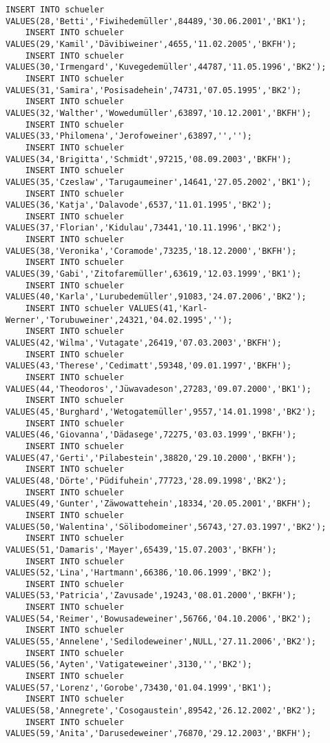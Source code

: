 \begin{lstlisting}[breaklines=True, numbers=none, basicstyle=\tiny, keepspaces=false]
	INSERT INTO schueler VALUES(28,'Betti','Fiwihedemüller',84489,'30.06.2001','BK1');
	INSERT INTO schueler VALUES(29,'Kamil','Dävibiweiner',4655,'11.02.2005','BKFH');
	INSERT INTO schueler VALUES(30,'Irmengard','Kuvegedemüller',44787,'11.05.1996','BK2');
	INSERT INTO schueler VALUES(31,'Samira','Posisadehein',74731,'07.05.1995','BK2');
	INSERT INTO schueler VALUES(32,'Walther','Wowedumüller',63897,'10.12.2001','BKFH');
	INSERT INTO schueler VALUES(33,'Philomena','Jerofoweiner',63897,'','');
	INSERT INTO schueler VALUES(34,'Brigitta','Schmidt',97215,'08.09.2003','BKFH');
	INSERT INTO schueler VALUES(35,'Czeslaw','Tarugaumeiner',14641,'27.05.2002','BK1');
	INSERT INTO schueler VALUES(36,'Katja','Dalavode',6537,'11.01.1995','BK2');
	INSERT INTO schueler VALUES(37,'Florian','Kidulau',73441,'10.11.1996','BK2');
	INSERT INTO schueler VALUES(38,'Veronika','Coramode',73235,'18.12.2000','BKFH');
	INSERT INTO schueler VALUES(39,'Gabi','Zitofaremüller',63619,'12.03.1999','BK1');
	INSERT INTO schueler VALUES(40,'Karla','Lurubedemüller',91083,'24.07.2006','BK2');
	INSERT INTO schueler VALUES(41,'Karl-Werner','Torubuweiner',24321,'04.02.1995','');
	INSERT INTO schueler VALUES(42,'Wilma','Vutagate',26419,'07.03.2003','BKFH');
	INSERT INTO schueler VALUES(43,'Therese','Cedimatt',59348,'09.01.1997','BKFH');
	INSERT INTO schueler VALUES(44,'Theodoros','Jüwavadeson',27283,'09.07.2000','BK1');
	INSERT INTO schueler VALUES(45,'Burghard','Wetogatemüller',9557,'14.01.1998','BK2');
	INSERT INTO schueler VALUES(46,'Giovanna','Dädasege',72275,'03.03.1999','BKFH');
	INSERT INTO schueler VALUES(47,'Gerti','Pilabestein',38820,'29.10.2000','BKFH');
	INSERT INTO schueler VALUES(48,'Dörte','Püdifuhein',77723,'28.09.1998','BK2');
	INSERT INTO schueler VALUES(49,'Gunter','Zäwowattehein',18334,'20.05.2001','BKFH');
	INSERT INTO schueler VALUES(50,'Walentina','Sölibodomeiner',56743,'27.03.1997','BK2');
	INSERT INTO schueler VALUES(51,'Damaris','Mayer',65439,'15.07.2003','BKFH');
	INSERT INTO schueler VALUES(52,'Lina','Hartmann',66386,'10.06.1999','BK2');
	INSERT INTO schueler VALUES(53,'Patricia','Zavusade',19243,'08.01.2000','BKFH');
	INSERT INTO schueler VALUES(54,'Reimer','Bowusadeweiner',56766,'04.10.2006','BK2');
	INSERT INTO schueler VALUES(55,'Annelene','Sedilodeweiner',NULL,'27.11.2006','BK2');
	INSERT INTO schueler VALUES(56,'Ayten','Vatigateweiner',3130,'','BK2');
	INSERT INTO schueler VALUES(57,'Lorenz','Gorobe',73430,'01.04.1999','BK1');
	INSERT INTO schueler VALUES(58,'Annegrete','Cosogaustein',89542,'26.12.2002','BK2');
	INSERT INTO schueler VALUES(59,'Anita','Darusedeweiner',76870,'29.12.2003','BKFH');

\end{lstlisting}
